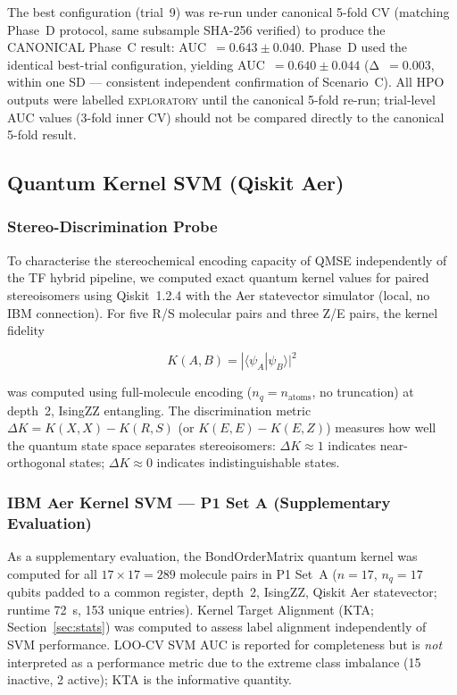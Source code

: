 The best configuration (trial~9) was re-run under canonical 5-fold CV
(matching Phase~D protocol, same subsample SHA-256 verified) to produce the
CANONICAL Phase~C result: AUC~$= 0.643 \pm 0.040$.
Phase~D used the identical best-trial configuration, yielding AUC~$= 0.640 \pm 0.044$
(Δ~$= 0.003$, within one SD — consistent independent confirmation of
Scenario~C). All HPO outputs were labelled \textsc{exploratory} until the
canonical 5-fold re-run; trial-level AUC values (3-fold inner CV) should
not be compared directly to the canonical 5-fold result.


\subsection{Quantum Kernel SVM (Qiskit Aer)}
\label{sec:stereo_probe_methods}

\subsubsection{Stereo-Discrimination Probe}

To characterise the stereochemical encoding capacity of QMSE independently
of the TF hybrid pipeline, we computed exact quantum kernel values for paired
stereoisomers using Qiskit~1.2.4\cite{qiskit} with the Aer statevector
simulator (local, no IBM connection). For five R/S molecular pairs and three
Z/E pairs, the kernel fidelity

\begin{equation}
K(A, B) = |\langle\psi_A|\psi_B\rangle|^2
\end{equation}

was computed using full-molecule encoding ($n_q = n_{\text{atoms}}$,
no truncation) at depth~2, IsingZZ entangling. The discrimination metric
$\Delta K = K(X, X) - K(R, S)$ (or $K(E, E) - K(E, Z)$) measures how
well the quantum state space separates stereoisomers: $\Delta K \approx 1$
indicates near-orthogonal states; $\Delta K \approx 0$ indicates
indistinguishable states.

\subsubsection{IBM Aer Kernel SVM — P1 Set A (Supplementary Evaluation)}

As a supplementary evaluation, the BondOrderMatrix quantum kernel was
computed for all $17 \times 17 = 289$ molecule pairs in P1 Set~A
($n = 17$, $n_q = 17$ qubits padded to a common register, depth~2,
IsingZZ, Qiskit Aer statevector; runtime 72~s, 153 unique entries).
Kernel Target Alignment (KTA; Section~\ref{sec:stats}) was computed
to assess label alignment independently of SVM performance. LOO-CV SVM
AUC is reported for completeness but is \emph{not} interpreted as a
performance metric due to the extreme class imbalance (15 inactive,
2 active); KTA is the informative quantity.

